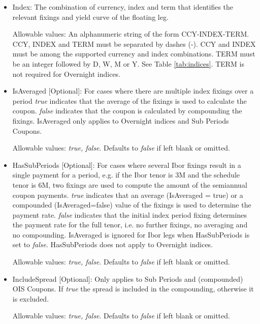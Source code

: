 \begin{itemize}
\item Index:  The combination of currency, index and term that
  identifies the relevant fixings and yield curve of the floating leg.  

  Allowable values: An alphanumeric string of the form CCY-INDEX-TERM. CCY, INDEX and TERM must be separated by dashes (-). CCY and INDEX must be among the supported currency and index combinations. TERM must be an integer followed by D, W,
  M or Y. See Table \ref{tab:indices}. TERM is not required for Overnight indices.

\item IsAveraged [Optional]:  For cases where there are multiple index fixings over a period \emph{true} indicates that
  the average of the fixings is used to calculate the coupon.  \emph{false} indicates that the coupon is calculated by
  compounding the fixings.  IsAveraged only applies to Overnight indices and Sub Periods Coupons.

Allowable values:  \emph{true, false}. Defaults to \emph{false} if left blank or omitted.

\item HasSubPeriods [Optional]: For cases where several Ibor fixings result in a single payment for a period, e.g. if
  the Ibor tenor is 3M and the schedule tenor is 6M, two fixings are used to compute the amount of the semiannual coupon
  payments. \emph{true} indicates that an average (IsAveraged = true) or a compounded (IsAveraged=false) value of the
  fixings is used to determine the payment rate.  \emph{false} indicates that the initial index period fixing determines the payment rate for the 
  full tenor, i.e. no further fixings, no averaging and no compounding. IsAveraged is ignored for Ibor legs when HasSubPeriods is set to  \emph{false}.
  HasSubPeriods does not apply to Overnight indices. 

Allowable values:  \emph{true, false}. Defaults to \emph{false} if left blank or omitted.

\item IncludeSpread [Optional]: Only applies to Sub Periods and (compounded) OIS Coupons. If \emph{true} the spread is
  included in the compounding, otherwise it is excluded.

Allowable values:  \emph{true, false}. Defaults to \emph{false} if left blank or omitted.


\end{itemize}
